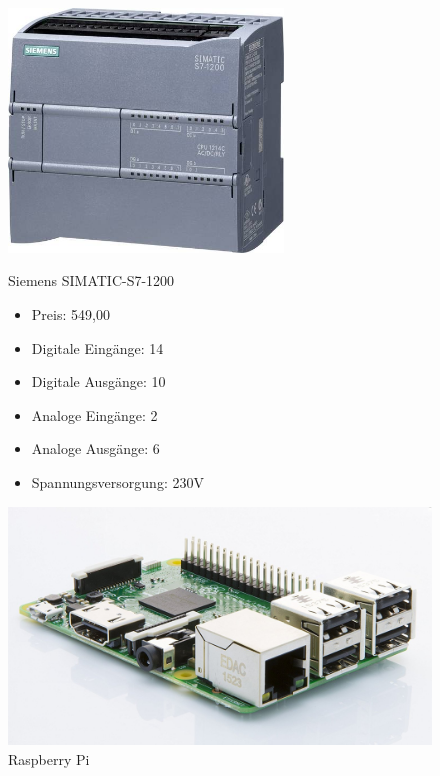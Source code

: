\begin{figure}[H]
\begin{minipage}[t]{0.45\textwidth}
\begin{center}
\includegraphics[width=0.65\textwidth]{fig/S7}
\end{center}
\caption{Siemens SIMATIC-S7-1200 \cite{preisS7}}

\begin{itemize}
	\item{Preis: 549,00\textsf{\texteuro}} 
	\item{Digitale Eingänge: 14}
	\item{Digitale Ausgänge: 10}
	\item{Analoge Eingänge: 2}
	\item{Analoge Ausgänge: 6}
	\item{Spannungsversorgung: 230V}
\end{itemize}

\end{minipage}
\hspace{0.1\textwidth}
\begin{minipage}[t]{0.45\textwidth}

\includegraphics[width=\textwidth]{fig/RPI}
\caption{Raspberry Pi}


\end{minipage}
\end{figure}
